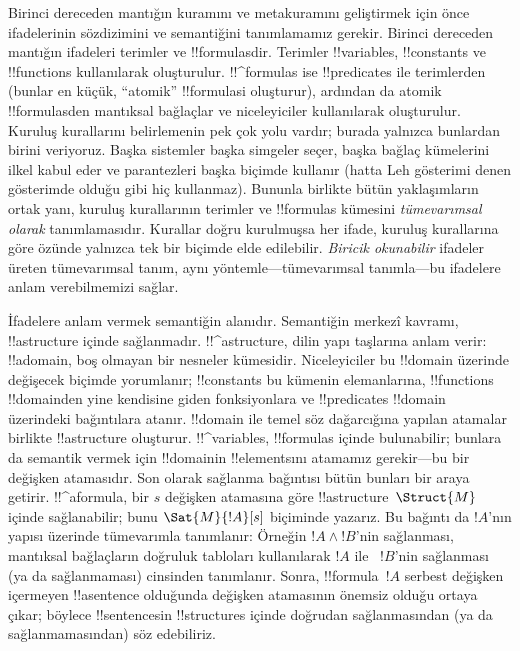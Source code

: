 \documentclass[../../../include/open-logic-section]{subfiles}
\begin{document}


Birinci dereceden mantığın kuramını ve metakuramını geliştirmek için önce
ifadelerinin sözdizimini ve semantiğini tanımlamamız gerekir. Birinci dereceden
mantığın ifadeleri terimler ve !!{formula}s{}dir. Terimler !!{variable}s,
!!{constant}s ve !!{function}s kullanılarak oluşturulur. !!^{formula}s ise
!!{predicate}s ile terimlerden (bunlar en küçük, ``atomik'' !!{formula}s{}i
oluşturur), ardından da atomik !!{formula}s{}den mantıksal bağlaçlar ve
niceleyiciler kullanılarak oluşturulur. Kuruluş kurallarını belirlemenin pek
çok yolu vardır; burada yalnızca bunlardan birini veriyoruz. Başka sistemler
başka simgeler seçer, başka bağlaç kümelerini ilkel kabul eder ve parantezleri
başka biçimde kullanır (hatta Leh gösterimi denen gösterimde olduğu gibi hiç
kullanmaz). Bununla birlikte bütün yaklaşımların ortak yanı, kuruluş
kurallarının terimler ve !!{formula}s kümesini \emph{tümevarımsal olarak}
tanımlamasıdır. Kurallar doğru kurulmuşsa her ifade, kuruluş kurallarına göre
özünde yalnızca tek bir biçimde elde edilebilir. \emph{Biricik okunabilir}
ifadeler üreten tümevarımsal tanım, aynı yöntemle---tümevarımsal tanımla---bu
ifadelere anlam verebilmemizi sağlar.

İfadelere anlam vermek semantiğin alanıdır. Semantiğin merkezî kavramı,
!!a{structure} içinde sağlanmadır. !!^a{structure}, dilin yapı taşlarına anlam
verir: !!a{domain}, boş olmayan bir nesneler kümesidir. Niceleyiciler bu
!!{domain} üzerinde değişecek biçimde yorumlanır; !!{constant}s bu kümenin
elemanlarına, !!{function}s !!{domain}{}den yine kendisine giden fonksiyonlara ve
!!{predicate}s !!{domain} üzerindeki bağıntılara atanır. !!{domain} ile temel
söz dağarcığına yapılan atamalar birlikte !!a{structure} oluşturur.
!!^{variable}s, !!{formula}s içinde bulunabilir; bunlara da semantik vermek
için !!{domain}{}in !!{element}s{}ını atamamız gerekir---bu bir değişken
atamasıdır. Son olarak sağlanma bağıntısı bütün bunları bir araya getirir.
!!^a{formula}, bir $s$ değişken atamasına göre !!a{structure}~$\Struct{M}$
içinde sağlanabilir; bunu $\Sat{M}{!A}[s]$ biçiminde yazarız. Bu bağıntı da
$!A$'nın yapısı üzerinde tümevarımla tanımlanır: Örneğin $!A \land !B$'nin
sağlanması, mantıksal bağlaçların doğruluk tabloları kullanılarak $!A$ ile
~$!B$'nin sağlanması (ya da sağlanmaması) cinsinden tanımlanır. Sonra,
!!{formula}~$!A$ serbest değişken içermeyen !!a{sentence} olduğunda değişken
atamasının önemsiz olduğu ortaya çıkar; böylece !!{sentence}s{}in
!!{structure}s içinde doğrudan sağlanmasından (ya da sağlanmamasından) söz
edebiliriz.
\end{document}
